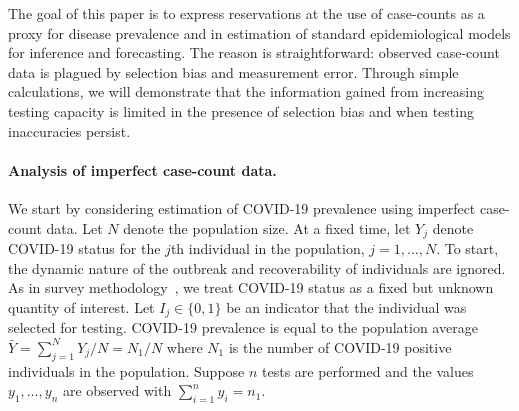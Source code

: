 \documentclass[12pt]{article}
\begin{document}
The goal of this paper is to express reservations at the use of case-counts as a proxy for disease prevalence and in estimation of standard epidemiological models for inference and forecasting.  The reason is straightforward: observed case-count data is plagued by selection bias and measurement error. Through simple calculations, we will demonstrate that the information gained from increasing testing capacity is limited in the presence of selection bias and when testing inaccuracies persist.

\paragraph*{Analysis of imperfect case-count data.}

We start by considering estimation of COVID-19 prevalence using imperfect case-count data. Let $N$ denote the population size.  At a fixed time, let $Y_j$ denote COVID-19 status for the $j$th individual in the population, $j=1,\ldots, N$. To start, the dynamic nature of the outbreak and recoverability of individuals are ignored.  As in survey methodology~\cite{Cochran77}, we treat COVID-19 status as a fixed but unknown quantity of interest. Let $I_j \in \{0,1\}$ be an indicator that the individual was selected for testing. COVID-19 prevalence is equal to the population average $\bar Y = \sum_{j=1}^N Y_j/N = N_1/N$ where $N_1$ is the number of COVID-19 positive individuals in the population.  Suppose $n$ tests are performed and the values $y_1, \ldots, y_n$ are observed with $\sum_{i=1}^n y_i = n_1$.
\end{document}
